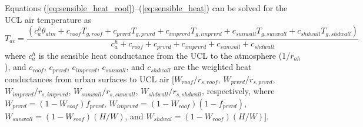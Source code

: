 \documentclass[12pt,authoryear]{elsarticle}
\numberwithin{equation}{section} %
\begin{document}
Equations (\ref{eq:sensible_heat_roof})--(\ref{eq:sensible_heat}) can be solved for the UCL air temperature as 
\begin{equation}
T_{ac}=\frac{\left(c_{a}^{h}\theta_{atm}+c_{roof}T_{g,roof}+c_{prvrd}T_{g,prvrd}+c_{imprvrd}T_{g,imprvrd}+c_{sunwall}T_{g,sunwall}+c_{shdwall}T_{g,shdwall}\right)}{c_{a}^{h}+c_{roof}+c_{prvrd}+c_{imprvrd}+c_{sunwall}+c_{shdwall}}
\end{equation}
where $c_{a}^{h}$ is the sensible heat conductance from the UCL to the atmosphere (1/$r_{ah}$), and $c_{roof}$, $c_{prvrd}$, $c_{imprvrd}$, $c_{sunwall}$, and $c_{shdwall}$ are the weighted heat conductances from urban surfaces to UCL air [$W_{roof}/r_{s,roof}$, $W_{prvrd}/r_{s,prvrd}$, $W_{imprvrd}/r_{s,imprvrd}$, $W_{sunwall}/r_{s,sunwall}$, $W_{shdwall}/r_{s,shdwall}$, respectively, where $W_{prvrd}=(1-W_{roof})f_{prvrd}$, $W_{imprvrd}=(1-W_{roof})(1-f_{prvrd})$, $W_{sunwall}=(1-W_{roof})(H/W)$, and $W_{shdwal}=(1-W_{roof})(H/W)$]. 
\end{document}
